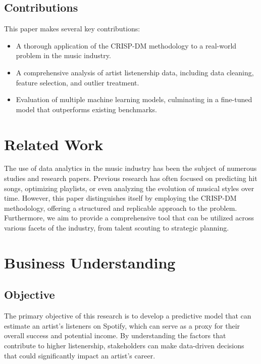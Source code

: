 \documentclass[12pt]{article}
\begin{document}
\subsection{Contributions}

This paper makes several key contributions:
\begin{itemize}
    \item A thorough application of the CRISP-DM methodology to a real-world problem in the music industry.
    \item A comprehensive analysis of artist listenership data, including data cleaning, feature selection, and outlier treatment.
    \item Evaluation of multiple machine learning models, culminating in a fine-tuned model that outperforms existing benchmarks.
\end{itemize}

\newpage

\section{Related Work}

The use of data analytics in the music industry has been the subject of numerous studies and research papers. Previous research has often focused on predicting hit songs, optimizing playlists, or even analyzing the evolution of musical styles over time. However, this paper distinguishes itself by employing the CRISP-DM methodology, offering a structured and replicable approach to the problem. Furthermore, we aim to provide a comprehensive tool that can be utilized across various facets of the industry, from talent scouting to strategic planning.

\newpage

\section{Business Understanding}

\subsection{Objective}

The primary objective of this research is to develop a predictive model that can estimate an artist's listeners on Spotify, which can serve as a proxy for their overall success and potential income. By understanding the factors that contribute to higher listenership, stakeholders can make data-driven decisions that could significantly impact an artist's career.
\end{document}
